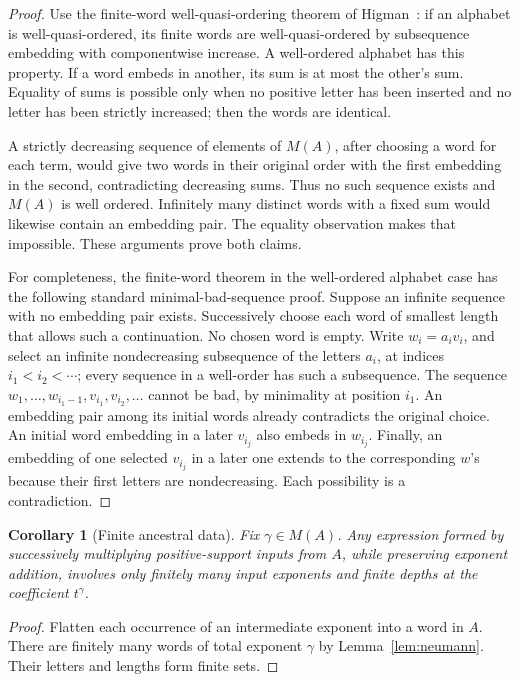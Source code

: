 \documentclass[11pt,a4paper]{article}
\numberwithin{equation}{section}
\newtheorem{corollary}[theorem]{Corollary}
\theoremstyle{definition}
\theoremstyle{remark}
\begin{document}
\begin{proof}
Use the finite-word well-quasi-ordering theorem of
Higman~\cite{Higman}: if an alphabet is well-quasi-ordered, its finite words
are well-quasi-ordered by subsequence embedding with componentwise
increase. A well-ordered alphabet has this property. If a word embeds in
another, its sum is at most the other's sum. Equality of sums is possible
only when no positive letter has been inserted and no letter has been
strictly increased; then the words are identical.

A strictly decreasing sequence of elements of $M(A)$, after choosing a
word for each term, would give two words in their original order with the
first embedding in the second, contradicting decreasing sums. Thus no such
sequence exists and $M(A)$ is well ordered. Infinitely many distinct words
with a fixed sum would likewise contain an embedding pair. The equality
observation makes that impossible. These arguments prove both claims.

For completeness, the finite-word theorem in the well-ordered alphabet
case has the following standard minimal-bad-sequence proof. Suppose an
infinite sequence with no embedding pair exists. Successively choose each
word of smallest length that allows such a continuation. No chosen word is
empty. Write $w_i=a_iv_i$, and select an infinite nondecreasing subsequence
of the letters $a_i$, at indices $i_1<i_2<\cdots$; every sequence in a
well-order has such a subsequence. The sequence
$w_1,\ldots,w_{i_1-1},v_{i_1},v_{i_2},\ldots$ cannot be bad, by minimality
at position $i_1$. An embedding pair among its initial words already
contradicts the original choice. An initial word embedding in a later
$v_{i_j}$ also embeds in $w_{i_j}$. Finally, an embedding of one selected
$v_{i_j}$ in a later one extends to the corresponding $w$'s because their
first letters are nondecreasing. Each possibility is a contradiction.
\end{proof}

\begin{corollary}[Finite ancestral data]\label{cor:ancestry}
Fix $\gamma\in M(A)$. Any expression formed by successively multiplying
positive-support inputs from $A$, while preserving exponent addition,
involves only finitely many input exponents and finite depths at the
coefficient $t^\gamma$.
\end{corollary}

\begin{proof}
Flatten each occurrence of an intermediate exponent into a word in $A$.
There are finitely many words of total exponent $\gamma$ by
Lemma~\ref{lem:neumann}. Their letters and lengths form finite sets.
\end{proof}
\end{document}
